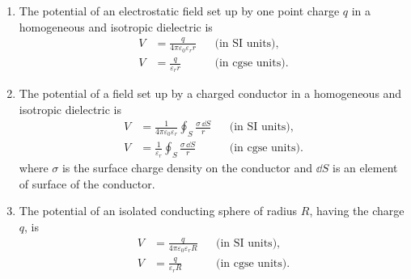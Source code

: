 \begin{enumerate}[label=(\arabic*)]
\item The potential of an electrostatic field set up by one point charge $q$ in a homogeneous and isotropic dielectric is
\begin{align*}%
V & = \frac{q}{4 \pi \varepsilon_{0} \varepsilon_{r} r} &&  \text{(in SI units),}\\
V & = \frac{q}{\varepsilon_{r} r} &&  \text{(in cgse units).}
\end{align*}

\item The potential of a field set up by a charged conductor  in a homogeneous and isotropic dielectric is
\begin{align*}%
V & = \frac{1}{4 \pi \varepsilon_{0} \varepsilon_{r}} \oint_{S} \frac{\sigma \, \dd S}{r} &&  \text{(in SI units),}\\
V & = \frac{1}{\varepsilon_{r}} \oint_{S} \frac{\sigma \, \dd S}{r} &&  \text{(in cgse units).}
\end{align*}
where $\sigma$ is the surface charge density on the conductor  and $\dd S$ is an element of surface of the conductor.

\item The potential of an isolated conducting sphere of radius $R$, having the charge $q$, is
\begin{align*}%
V & = \frac{q}{4 \pi \varepsilon_{0} \varepsilon_{r} R} &&  \text{(in SI units),}\\
V & = \frac{q}{\varepsilon_{r} R} &&  \text{(in cgse units).}
\end{align*}
\end{enumerate}

